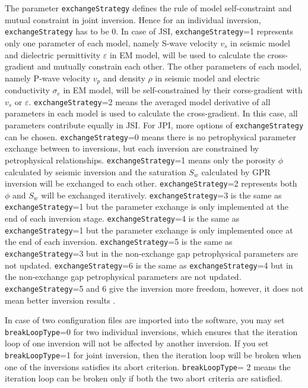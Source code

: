 \documentclass[pdftex,a4paper,parskip,listof=totoc,bibliography=totoc,onehalfspacing,12pt]{scrreprt}
\begin{document}
The parameter \verb+exchangeStrategy+ defines the rule of model self-constraint and mutual constraint in joint inversion. Hence for an individual inversion, \verb+exchangeStrategy+ has to be 0. In case of JSI, \verb+exchangeStrategy+=1 represents only one parameter of each model, namely S-wave velocity $v_s$ in seismic model and dielectric permittivity $\varepsilon$ in EM model, will be used to calculate the cross-gradient and mutually constrain each other. The other parameters of each model, namely P-wave velocity $v_p$ and density $\rho$ in seismic model and electric conductivity $\sigma_e$ in EM model, will be self-constrained by their corss-gradient with $v_s$ or $\varepsilon$. \verb+exchangeStrategy+=2 means the averaged model derivative of all parameters in each model is used to calculate the cross-gradient. In this case, all parameters contribute equally in JSI. For JPI, more options of \verb+exchangeStrategy+ can be chosen. \verb+exchangeStrategy+=0 means there is no petrophysical parameter exchange between to inversions, but each inversion are constrained by petrophysical relationships. \verb+exchangeStrategy+=1 means only the porosity $\phi$ calculated by seismic inversion and the saturation $S_w$ calculated by GPR inversion will be exchanged to each other. \verb+exchangeStrategy+=2 represents both $\phi$ and $S_w$ will be exchanged iteratively. \verb+exchangeStrategy+=3 is the same as \verb+exchangeStrategy+=1 but the parameter exchange is only implemented at the end of each inversion stage. \verb+exchangeStrategy+=4 is the same as \verb+exchangeStrategy+=1 but the parameter exchange is only implemented once at the end of each inversion. \verb+exchangeStrategy+=5 is the same as \verb+exchangeStrategy+=3 but in the non-exchange gap petrophysical parameters are not updated. \verb+exchangeStrategy+=6 is the same as \verb+exchangeStrategy+=4 but in the non-exchange gap petrophysical parameters are not updated. \verb+exchangeStrategy+=5 and 6 give the inversion more freedom, however, it does not mean better inversion results \cite{qin2021joint}.

In case of two configuration files are imported into the software, you may set \verb+breakLoopType+=0 for two individual inversions, which ensures that the iteration loop of one inversion will not be affected by another inversion. If you set \verb+breakLoopType+=1 for joint inversion, then the iteration loop will be broken when one of the inversions satisfies its abort criterion. \verb+breakLoopType+= 2 means the iteration loop can be broken only if both the two abort criteria are satisfied.
\end{document}
